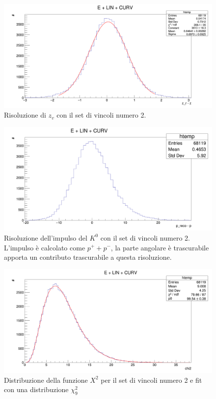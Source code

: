 \documentclass[8pt]{extarticle}
\begin{document}
\begin{figure}
	\begin{center}
		\includegraphics[scale=0.25]{set_2_z} 
		\caption{Risoluzione di $z_v$ con il set di vincoli numero 2.}
		\label{fig:set_2_z}
	\end{center}
\end{figure}

\begin{figure}
	\begin{center}
		\includegraphics[scale=0.25]{set_2_p} 
		\caption{Risoluzione dell'impulso del $K^0$ con il set di vincoli numero 2. L'impulso è calcolato come $p^+ + p^-$, la parte angolare è trascurabile apporta un contributo trascurabile a questa risoluzione.}
		\label{fig:set_2_p}
	\end{center}
\end{figure}

\begin{figure}
	\begin{center}
		\includegraphics[scale=0.25]{set_2_chi2} 
		\caption{Distribuzione della funzione $X^2$ per il set di vincoli numero 2 e fit con una distribuzione $\chi^2_9$}
		\label{fig:set_2_chi2}
	\end{center}
\end{figure}
\end{document}
